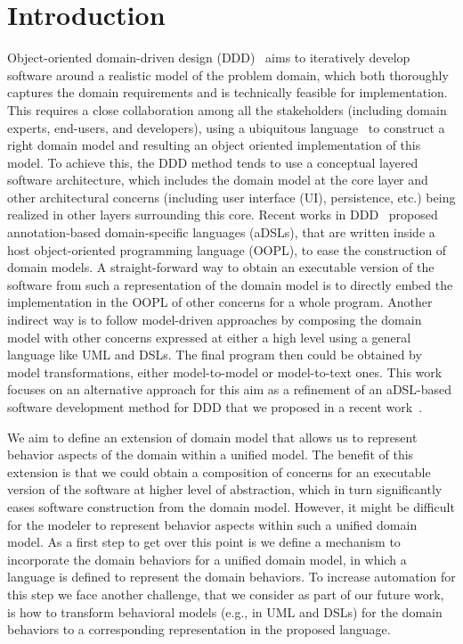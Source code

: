 %
\section{Introduction}\label{sect:introduction}
Object-oriented domain-driven design (DDD)~\cite{evans_domain-driven_2004} aims to iteratively develop software around a realistic model of the problem domain, which both thoroughly captures the domain requirements and is technically feasible for implementation. This requires a close collaboration among all the stakeholders (including domain experts, end-users, and developers), using a ubiquitous language~\cite{evans_domain-driven_2004} to construct a right domain model and resulting an object oriented implementation of this model. To achieve this, the DDD method tends to use a conceptual layered software architecture, which includes the domain model at the core layer and other architectural concerns (including user interface (UI), persistence, etc.) being realized in other layers surrounding this core. %
%
%
Recent works in DDD~\cite{dan_haywood_apache_2013, paniza_learn_2011} proposed  annotation-based domain-specific languages (aDSLs), that are written inside a host object-oriented programming language (OOPL), to ease the construction of domain models. A straight-forward way to obtain an executable version of the software from such a representation of the domain model is to directly embed the implementation in the OOPL of other concerns for a whole program. Another indirect way is to follow model-driven approaches by composing the domain model with other concerns expressed at either a high level using a general language like UML and DSLs. The final program then could be obtained by model transformations, either model-to-model or model-to-text ones. This work focuses on an alternative approach for this aim as a refinement of an aDSL-based software development method for DDD that we proposed in a recent work~\cite{le_domain_2018}. 

We aim to define an extension of domain model that allows us to represent behavior aspects of the domain within a unified model. The benefit of this extension is that we could obtain a composition of concerns for an executable version of the software at higher level of abstraction, which in turn significantly eases software construction from the domain model. However, it might be difficult for the modeler to represent behavior aspects within such a unified domain model. As a first step to get over this point is we define a mechanism to incorporate the domain behaviors for a unified domain model, in which a language is defined to represent the domain behaviors. To increase automation for this step we face another challenge, that we consider as part of our future work, is how to transform behavioral models (e.g., in UML and DSLs) for the domain behaviors to a corresponding representation in the proposed language.

